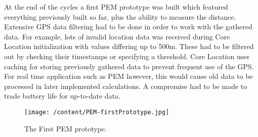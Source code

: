 \documentclass[12pt, a4paper]{report}   %
\begin{document}
\begin{enumerate}
At the end of the cycles a first PEM prototype was built which featured everything previously built so far, plus the ability to measure the distance. Extensive GPS data filtering had to be done in order to work with the gathered data. For example, lots of invalid location data was received during Core Location initialization with values differing up to 500m. These had to be filtered out by checking their timestamps or specifying a threshold. Core Location uses caching for storing previously gathered data to prevent frequent use of the GPS. For real time application such as PEM however, this would cause old data to be processed in later implemented calculations. A compromise had to be made to trade battery life for up-to-date data.


\begin{figure}[H]
  \centering
	\texttt{[image: /content/PEM-firstPrototype.jpg]}
	  \caption{The First PEM prototype.}
\end{figure}


\clearpage

\end{enumerate}
\end{document}
